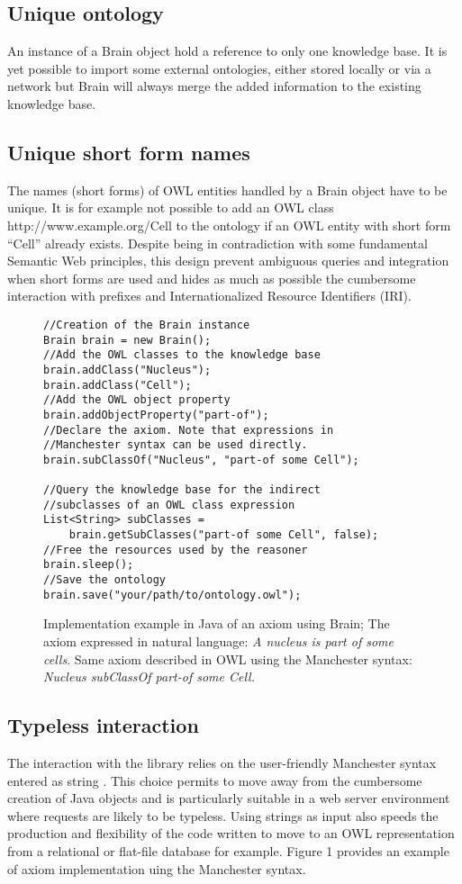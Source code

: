 \documentclass{bioinfo}
\begin{document}
\subsection{Unique ontology}
An instance of a Brain object hold a reference to only one knowledge base. It is yet possible to import some external ontologies, either
stored locally or via a network but Brain will always merge the added information to the existing knowledge base.
\subsection{Unique short form names}
The names (short forms) of OWL entities handled by a Brain object have to be unique. It is for example not possible to add
an OWL class http://www.example.org/Cell to the ontology if an OWL entity with short form ``Cell'' already exists.
Despite being in contradiction with some fundamental Semantic Web principles, this design prevent ambiguous queries and integration when 
short forms are used and hides as much as possible the cumbersome interaction with prefixes and Internationalized Resource Identifiers (IRI).

\begin{figure}[h]
\begingroup
\fontsize{7pt}{8pt}\selectfont
\begin{Verbatim}[frame=single]
//Creation of the Brain instance
Brain brain = new Brain();
//Add the OWL classes to the knowledge base
brain.addClass("Nucleus");
brain.addClass("Cell");
//Add the OWL object property
brain.addObjectProperty("part-of");
//Declare the axiom. Note that expressions in 
//Manchester syntax can be used directly.
brain.subClassOf("Nucleus", "part-of some Cell");

//Query the knowledge base for the indirect
//subclasses of an OWL class expression
List<String> subClasses = 
    brain.getSubClasses("part-of some Cell", false);
//Free the resources used by the reasoner
brain.sleep();
//Save the ontology
brain.save("your/path/to/ontology.owl");
\end{Verbatim}
\endgroup
\caption{Implementation example in Java of an axiom using Brain; The axiom expressed in natural language:
 \textit{A nucleus is part of some cells}. Same axiom described in OWL using the Manchester syntax: 
 \textit{Nucleus subClassOf part-of some Cell.}}
\end{figure}

\subsection{Typeless interaction}
The interaction with the library relies on the user-friendly Manchester syntax entered as string \citep{Horridge2006}. 
This choice permits to move away from the cumbersome creation of Java objects and is particularly suitable in a web server environment where
requests are likely to be typeless. Using strings as input also speeds the production
and flexibility of the code written to move to an OWL representation from a relational or flat-file database for example. Figure 1 provides
an example of axiom implementation uing the Manchester syntax.
\end{document}
